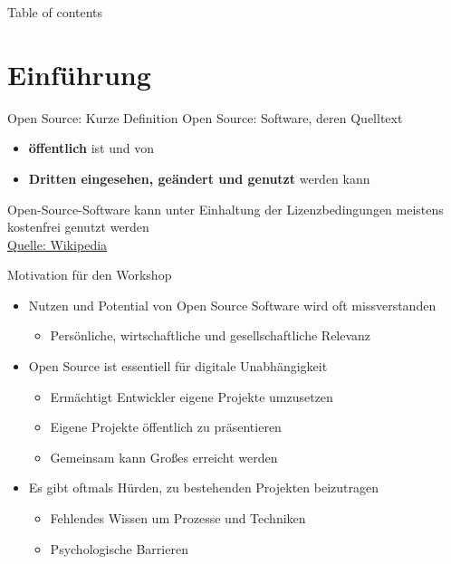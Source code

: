 \documentclass[compress,aspectratio=169]{beamer}
\title{\Large \mytitle}
\date{\mydate}
\subtitle{\mysubtitle}
\author{{\myauthor}}
\institute{\myinstitute}
\begin{document}
\begin{frame}[plain]
	\titlepage
\end{frame}

\begin{frame}[t]{Table of contents}
  \tableofcontents[subsectionstyle=hide/hide]
\end{frame}


\section{Einführung}

\begin{frame}{Open Source: Kurze Definition}
  Open Source: Software, deren Quelltext 
  \begin{itemize}
    \item \textbf{öffentlich} ist und von 
    \item \textbf{Dritten eingesehen, geändert und genutzt} werden kann
  \end{itemize}
  Open-Source-Software kann unter Einhaltung der Lizenzbedingungen meistens kostenfrei genutzt werden \\
  \hfill \href{https://de.wikipedia.org/wiki/Open_Source}{Quelle: Wikipedia}
\end{frame}

\begin{frame}{Motivation für den Workshop}
  \begin{itemize}
    \item Nutzen und Potential von Open Source Software wird oft missverstanden
      \begin{itemize}
        \item Persönliche, wirtschaftliche und gesellschaftliche Relevanz
      \end{itemize}
    \item Open Source ist essentiell für digitale Unabhängigkeit 
    \begin{itemize}
      \item Ermächtigt Entwickler eigene Projekte umzusetzen 
      \item Eigene Projekte öffentlich zu präsentieren
      \item Gemeinsam kann Großes erreicht werden
    \end{itemize}
    \item Es gibt oftmals Hürden, zu bestehenden Projekten beizutragen
    \begin{itemize}
      \item Fehlendes Wissen um Prozesse und Techniken
      \item Psychologische Barrieren
    \end{itemize}
  \end{itemize}
\end{frame}
\end{document}
